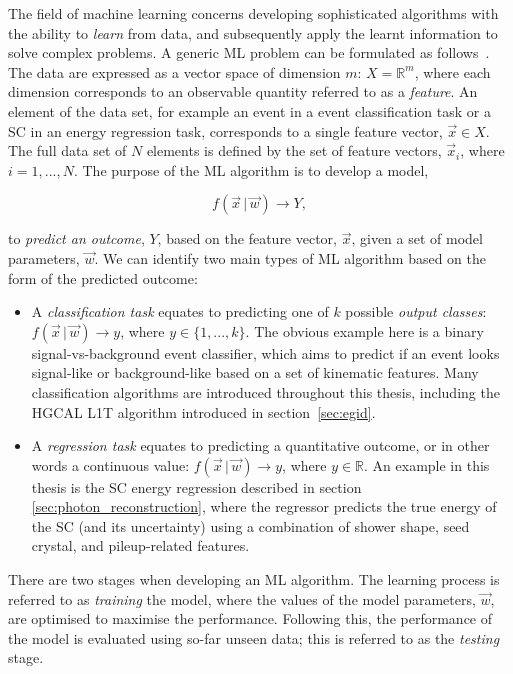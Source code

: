 The field of machine learning concerns developing sophisticated algorithms with the ability to \textit{learn} from data, and subsequently apply the learnt information to solve complex problems. A generic ML problem can be formulated as follows~\cite{hastie01statisticallearning}. The data are expressed as a vector space of dimension $m$: $X = \mathbb{R}^m$, where each dimension corresponds to an observable quantity referred to as a \textit{feature}. An element of the data set, for example an event in a event classification task or a SC in an energy regression task, corresponds to a single feature vector, $\vec{x} \in X$. The full data set of $N$ elements is defined by the set of feature vectors, $\vec{x}_i$, where $i=1,...,N$. The purpose of the ML algorithm is to develop a model,

\begin{equation}
    f(\vec{x}\,|\,\vec{w}) \rightarrow Y,
\end{equation}

\noindent
to \textit{predict an outcome}, $Y$, based on the feature vector, $\vec{x}$, given a set of model parameters, $\vec{w}$. We can identify two main types of ML algorithm based on the form of the predicted outcome:

\begin{itemize}
    \item A \textit{classification task} equates to predicting one of $k$ possible \textit{output classes}: $f(\vec{x}\,|\,\vec{w})\rightarrow y$, where $y\in \{1,...,k\}$. The obvious example here is a binary signal-vs-background event classifier, which aims to predict if an event looks signal-like or background-like based on a set of kinematic features. Many classification algorithms are introduced throughout this thesis, including the HGCAL L1T algorithm introduced in section~\ref{sec:egid}.
    
    \item A \textit{regression task} equates to predicting a quantitative outcome, or in other words a continuous value: $f(\vec{x}\,|\,\vec{w})\rightarrow y$, where $y\in \mathbb{R}$. An example in this thesis is the SC energy regression described in section \ref{sec:photon_reconstruction}, where the regressor predicts the true energy of the SC (and its uncertainty) using a combination of shower shape, seed crystal, and pileup-related features.
\end{itemize}

There are two stages when developing an ML algorithm. The learning process is referred to as \textit{training} the model, where the values of the model parameters, $\vec{w}$, are optimised to maximise the performance. Following this, the performance of the model is evaluated using so-far unseen data; this is referred to as the \textit{testing} stage.

